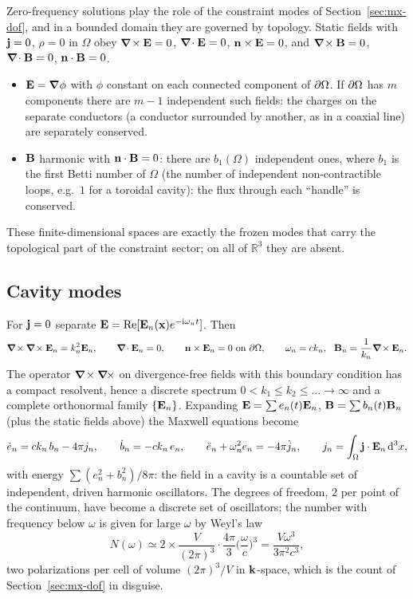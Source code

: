 Zero-frequency solutions play the role of the constraint modes of
Section~\ref{sec:mx-dof}, and in a bounded domain they are governed by
topology.  Static fields with $\mathbf{j}=0$, $\rho=0$ in $\Omega$ obey
$\boldsymbol{\nabla}\!\times\mathbf{E}=0$, $\boldsymbol{\nabla}\!\cdot\mathbf{E}=0$, $\mathbf{n}\times\mathbf{E}=0$, and $\boldsymbol{\nabla}\!\times\mathbf{B}=0$,
$\boldsymbol{\nabla}\!\cdot\mathbf{B}=0$, $\mathbf{n}\cdot\mathbf{B}=0$.
\begin{itemize}
\item $\mathbf{E}=\boldsymbol{\nabla}\phi$ with $\phi$ constant on each connected component of $\partial\Omega$.
  If $\partial\Omega$ has $m$ components there are $m-1$ independent such fields:
  the charges on the separate conductors (a conductor surrounded by
  another, as in a coaxial line) are separately conserved.
\item $\mathbf{B}$ harmonic with $\mathbf{n}\cdot\mathbf{B}=0$: there are $b_1(\Omega)$ independent
  ones, where $b_1$ is the first Betti number of $\Omega$ (the number of independent
  non-contractible loops, e.g.\ $1$ for a toroidal cavity): the flux
  through each ``handle'' is conserved.
\end{itemize}
These finite-dimensional spaces are exactly the frozen modes that
carry the topological part of the constraint sector; on all of
$\mathbb R^3$ they are absent.

\subsection{Cavity modes}

For $\mathbf{j}=0$ separate $\mathbf{E}=\operatorname{Re}[\mathbf{E}_n(\mathbf{x})e^{-\mathrm{i}\omega_nt}]$.
Then
\begin{equation}\label{eq:cavity}
\curl\curl\vE_n=k_n^2\vE_n,\qquad\divg\vE_n=0,\qquad\vn\times\vE_n=0\ \text{on }\pa\Omega,\qquad
\omega_n=ck_n,\ \ \vB_n=\frac1{k_n}\curl\vE_n .
\end{equation}
The operator $\boldsymbol{\nabla}\!\times\boldsymbol{\nabla}\!\times$ on divergence-free fields with this boundary condition has a compact
resolvent, hence a discrete spectrum $0<k_1\le k_2\le\dots\to\infty$ and
a complete orthonormal family $\{\mathbf{E}_n\}$.  Expanding
$\mathbf{E}=\sum e_n(t)\mathbf{E}_n$, $\mathbf{B}=\sum b_n(t)\mathbf{B}_n$ (plus the static fields above)
the Maxwell equations become
\begin{equation}
\dot e_n=ck_n\,b_n-4\pi j_n,\qquad \dot b_n=-ck_n\,e_n,\qquad
\ddot e_n+\omega_n^2e_n=-4\pi\dot j_n,\qquad j_n=\int_\Omega\mathbf{j}\cdot\mathbf{E}_n\,\mathrm{d}^3x,
\end{equation}
with energy $\sum(e_n^2+b_n^2)/8\pi$: the field in a cavity is a countable
set of independent, driven harmonic oscillators.  The degrees of
freedom, $2$ per point of the continuum, have become a discrete set of
oscillators; the number with frequency below $\omega$ is given for large $\omega$
by Weyl's law
\begin{equation}
N(\omega)\simeq 2\times\frac{V}{(2\pi)^3}\cdot\frac{4\pi}3\Big(\frac\omega c\Big)^3
=\frac{V\omega^3}{3\pi^2c^3},
\end{equation}
two polarizations per cell of volume $(2\pi)^3/V$ in $\mathbf{k}$-space, which is
the count of Section~\ref{sec:mx-dof} in disguise.

